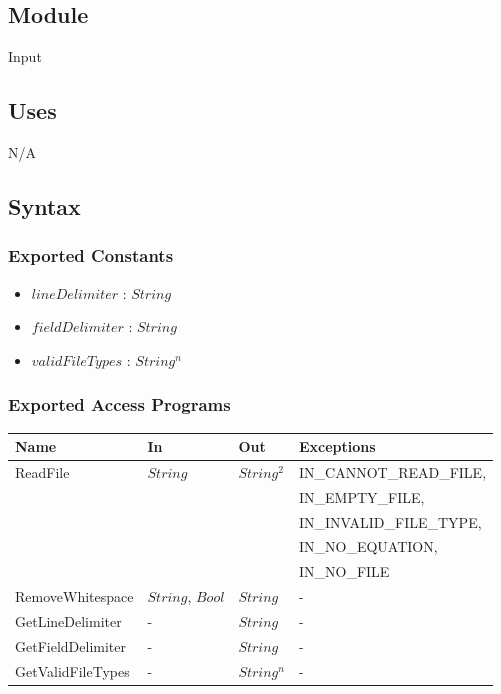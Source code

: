 \documentclass[12pt, titlepage]{article}
\begin{document}
\subsection{Module}

Input

\subsection{Uses}

N/A

\subsection{Syntax}

\subsubsection{Exported Constants}

\begin{itemize}
	\item $lineDelimiter$ : $String$
	\item $fieldDelimiter$ : $String$
	\item $validFileTypes$ : $String^n$
\end{itemize}

\subsubsection{Exported Access Programs}

\begin{center}
	\begin{tabular}{p{3.3cm} p{3cm} p{3cm} p{5cm}}
		\hline
		\textbf{Name} & \textbf{In} & \textbf{Out} & \textbf{Exceptions} \\
		\hline
		\multirow{5}{3.3cm}{ReadFile} & \multirow{5}{3cm}{$String$} & 
		\multirow{5}{3cm}{$String^2$} & IN\_CANNOT\_READ\_FILE, \\
		 &  &  & IN\_EMPTY\_FILE, \\
		 & & & IN\_INVALID\_FILE\_TYPE,\\
		 & & &  IN\_NO\_EQUATION,\\
		 & & & IN\_NO\_FILE\\
		 RemoveWhitespace & $String$, $Bool$ & $String$ & - \\
		 GetLineDelimiter & - & $String$ & - \\
		 GetFieldDelimiter & - & $String$ & - \\
		 GetValidFileTypes & - & $String^n$ & - \\
		\hline
	\end{tabular}
\end{center}
\end{document}

